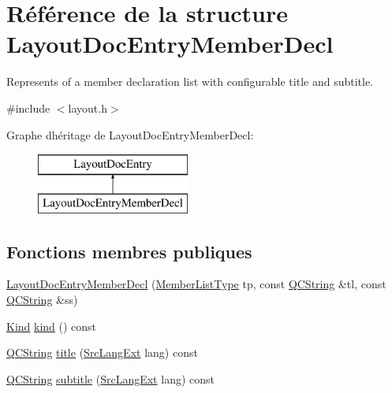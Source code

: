 \hypertarget{struct_layout_doc_entry_member_decl}{}\section{Référence de la structure Layout\+Doc\+Entry\+Member\+Decl}
\label{struct_layout_doc_entry_member_decl}


Represents of a member declaration list with configurable title and subtitle.  




{\ttfamily \#include $<$layout.\+h$>$}

Graphe d\textquotesingle{}héritage de Layout\+Doc\+Entry\+Member\+Decl\+:\begin{figure}[H]
\begin{center}
\leavevmode
\includegraphics[height=2.000000cm]{struct_layout_doc_entry_member_decl}
\end{center}
\end{figure}
\subsection*{Fonctions membres publiques}
\begin{DoxyCompactItemize}
\item 
\hyperlink{struct_layout_doc_entry_member_decl_a10fad7cf84e33c32c4db54d26d5ed26f}{Layout\+Doc\+Entry\+Member\+Decl} (\hyperlink{types_8h_abe8ad5992f8938a28f918f51b199aa19}{Member\+List\+Type} tp, const \hyperlink{class_q_c_string}{Q\+C\+String} \&tl, const \hyperlink{class_q_c_string}{Q\+C\+String} \&ss)
\item 
\hyperlink{struct_layout_doc_entry_a89dcbe762ed7e7f7790d8c034cf8ea01}{Kind} \hyperlink{struct_layout_doc_entry_member_decl_aaa9758d4babd3703ed62fcc67bab03b8}{kind} () const 
\item 
\hyperlink{class_q_c_string}{Q\+C\+String} \hyperlink{struct_layout_doc_entry_member_decl_a07452326eeff19ea869fd74b8bfc5720}{title} (\hyperlink{types_8h_a9974623ce72fc23df5d64426b9178bf2}{Src\+Lang\+Ext} lang) const 
\item 
\hyperlink{class_q_c_string}{Q\+C\+String} \hyperlink{struct_layout_doc_entry_member_decl_a00357a9e782249aa3060c70632885439}{subtitle} (\hyperlink{types_8h_a9974623ce72fc23df5d64426b9178bf2}{Src\+Lang\+Ext} lang) const 
\end{DoxyCompactItemize}
